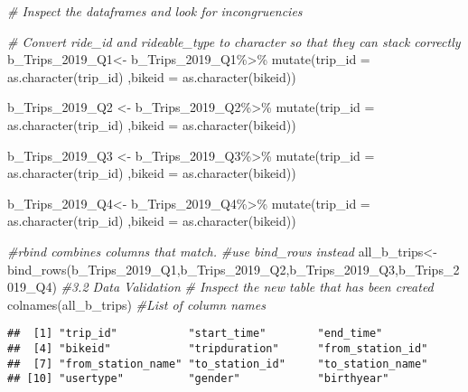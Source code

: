 \documentclass[
]{article}
\newenvironment{Shaded}{\begin{snugshade}}{\end{snugshade}}
\newcommand{\AttributeTok}[1]{\textcolor[rgb]{0.77,0.63,0.00}{#1}}
\newcommand{\CommentTok}[1]{\textcolor[rgb]{0.56,0.35,0.01}{\textit{#1}}}
\newcommand{\FunctionTok}[1]{\textcolor[rgb]{0.00,0.00,0.00}{#1}}
\newcommand{\NormalTok}[1]{#1}
\newcommand{\OtherTok}[1]{\textcolor[rgb]{0.56,0.35,0.01}{#1}}
\newcommand{\SpecialCharTok}[1]{\textcolor[rgb]{0.00,0.00,0.00}{#1}}
\begin{document}
\begin{Shaded}
\begin{Highlighting}[]
\CommentTok{\# Inspect the dataframes and look for incongruencies}
 
\CommentTok{\# Convert ride\_id and rideable\_type to character so that they can stack correctly}
\NormalTok{b\_Trips\_2019\_Q1}\OtherTok{\textless{}{-}}\NormalTok{ b\_Trips\_2019\_Q1}\SpecialCharTok{\%\textgreater{}\%}
                  \FunctionTok{mutate}\NormalTok{(}\AttributeTok{trip\_id =} \FunctionTok{as.character}\NormalTok{(trip\_id)}
\NormalTok{                  ,}\AttributeTok{bikeid =} \FunctionTok{as.character}\NormalTok{(bikeid)) }

\NormalTok{b\_Trips\_2019\_Q2 }\OtherTok{\textless{}{-}}\NormalTok{ b\_Trips\_2019\_Q2}\SpecialCharTok{\%\textgreater{}\%}
                   \FunctionTok{mutate}\NormalTok{(}\AttributeTok{trip\_id =} \FunctionTok{as.character}\NormalTok{(trip\_id)}
\NormalTok{                  ,}\AttributeTok{bikeid =} \FunctionTok{as.character}\NormalTok{(bikeid)) }

\NormalTok{b\_Trips\_2019\_Q3 }\OtherTok{\textless{}{-}}\NormalTok{  b\_Trips\_2019\_Q3}\SpecialCharTok{\%\textgreater{}\%}
                    \FunctionTok{mutate}\NormalTok{(}\AttributeTok{trip\_id =} \FunctionTok{as.character}\NormalTok{(trip\_id)}
\NormalTok{                   ,}\AttributeTok{bikeid =} \FunctionTok{as.character}\NormalTok{(bikeid)) }

\NormalTok{b\_Trips\_2019\_Q4}\OtherTok{\textless{}{-}}\NormalTok{ b\_Trips\_2019\_Q4}\SpecialCharTok{\%\textgreater{}\%}
                  \FunctionTok{mutate}\NormalTok{(}\AttributeTok{trip\_id =} \FunctionTok{as.character}\NormalTok{(trip\_id)}
\NormalTok{                  ,}\AttributeTok{bikeid =} \FunctionTok{as.character}\NormalTok{(bikeid))}

\CommentTok{\#rbind combines columns that match.}
\CommentTok{\#use bind\_rows instead}
\NormalTok{all\_b\_trips}\OtherTok{\textless{}{-}}\FunctionTok{bind\_rows}\NormalTok{(b\_Trips\_2019\_Q1,b\_Trips\_2019\_Q2,b\_Trips\_2019\_Q3,b\_Trips\_2019\_Q4)}
\CommentTok{\#3.2 Data Validation}
\CommentTok{\# Inspect the new table that has been created}
\FunctionTok{colnames}\NormalTok{(all\_b\_trips)  }\CommentTok{\#List of column names}
\end{Highlighting}
\end{Shaded}

\begin{verbatim}
##  [1] "trip_id"           "start_time"        "end_time"         
##  [4] "bikeid"            "tripduration"      "from_station_id"  
##  [7] "from_station_name" "to_station_id"     "to_station_name"  
## [10] "usertype"          "gender"            "birthyear"
\end{verbatim}
\end{document}
